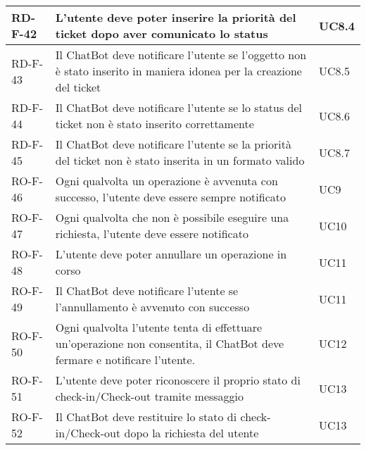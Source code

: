 \begin{center}
\begin{tabular}{ | m{8em} | m{18em} | m{12em} | }
\hline
RD-F-42&L’utente deve poter inserire la priorità del ticket dopo aver comunicato lo status &UC8.4 \\
\hline
RD-F-43&Il ChatBot deve notificare l’utente se l’oggetto non è stato inserito in maniera idonea per la creazione del ticket  &UC8.5 \\
\hline
RD-F-44&Il ChatBot deve notificare l’utente se lo status del ticket non è stato inserito correttamente  &UC8.6 \\
\hline
RD-F-45&Il ChatBot deve notificare l’utente se la priorità del ticket non è stato inserita in un formato valido &UC8.7 \\
\hline
RO-F-46&Ogni qualvolta un operazione è avvenuta con successo, l’utente deve essere sempre notificato &UC9 \\
\hline
RO-F-47&Ogni qualvolta che non è possibile eseguire una richiesta, l’utente deve essere notificato &UC10 \\
\hline
RO-F-48&L’utente deve poter annullare un operazione in corso &UC11 \\
\hline
RO-F-49&Il ChatBot deve notificare l’utente se l’annullamento è avvenuto con successo &UC11 \\
\hline
RO-F-50&Ogni qualvolta l’utente tenta di effettuare un’operazione non consentita, il ChatBot deve fermare e notificare l'utente.&UC12 \\
\hline
RO-F-51&L’utente deve poter riconoscere il proprio stato di check-in/Check-out tramite messaggio &UC13 \\
\hline
RO-F-52&Il ChatBot deve restituire lo stato di check-in/Check-out dopo la richiesta del utente &UC13\\
\hline
\end{tabular}
\newpage


\end{center}
